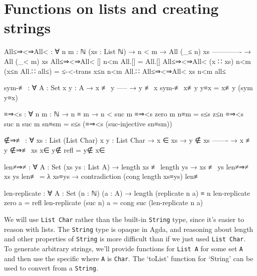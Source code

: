 \begin{comment}
  -- Import list membership using List Char comparisons.
  private
    _≟lchar_ : ∀ (xs ys : List Char) → Dec (xs ≡ ys)
    xs ≟lchar ys = ≡-dec (_≟char_) xs ys
  
  open DecPropMembership _≟lchar_ using (_∈_; _∉_; _∈?_)

  \end{code}
  
  Include some infixes.
  
  \begin{code}
  infix  4  _∋_⦂_
  infix  4 _⊢_⦂_
  infixl 5 _,_⦂_
  
  infixr 7 _⇒_
  
  infix  5 ƛ_
  infixl 7 _·_
  infix  9 free_
  infix  9 bound_
  \end{code}
\end{comment}

\section{Functions on lists and creating strings}
\label{appendix:list_functions}
\begin{code}
  All≤⇒<⇒All< : ∀ {n m : ℕ} (xs : List ℕ)
    → n < m
    → All (_≤ n) xs
      -------------
    → All (_< m) xs
  All≤⇒<⇒All< [] n<m All.[] = All.[]
  All≤⇒<⇒All< (x ∷ xs) n<m (x≤n All.∷ all≤) =
    ≤-<-trans x≤n n<m All.∷ All≤⇒<⇒All< xs n<m all≤

  sym-≢ : ∀ {A : Set} {x y : A}
    → x ≢ y
      -----
    → y ≢ x
  sym-≢ x≢y y≡x = x≢y (sym y≡x)

  ≡⇒<s : ∀ {n m : ℕ} → n ≡ m → n < suc m
  ≡⇒<s {zero} {m} n≡m = s≤s z≤n
  ≡⇒<s {suc n} {suc m} sn≡sm = s≤s (≡⇒<s (suc-injective sn≡sm))

  ∉⇒≢ : ∀ {xs : List (List Char)} {x y : List Char}
    → x ∈ xs
    → y ∉ xs
      -------
    → x ≢ y
  ∉⇒≢ {xs} x∈ y∉ refl = y∉ x∈

  len≠⇒≠ : ∀ {A : Set} (xs ys : List A)
    → length xs ≢ length ys → xs ≢ ys
  len≠⇒≠ xs ys len≢ =
    λ xs≡ys → contradiction (cong length xs≡ys) len≢

  len-replicate : ∀ {A : Set} (n : ℕ) (a : A)
    → length (replicate n a) ≡ n
  len-replicate zero a = refl
  len-replicate (suc n) a = cong suc (len-replicate n a)
\end{code}


We will use \texttt{List Char} rather than the built-in \texttt{String} type, since it's easier to
reason with lists. The \texttt{String} type is opaque in Agda, and reasoning about length and other
properties of \texttt{String} is more difficult than if we just used \texttt{List Char}. To generate
arbitrary strings, we'll provide functions for \texttt{List A} for some set \texttt{A} and then use
the specific where \texttt{A} is \texttt{Char}. The `toList' function for `String' can be used to
convert from a \texttt{String}.

